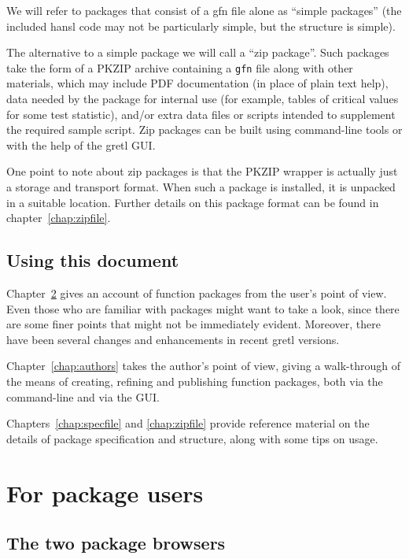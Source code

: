 \documentclass[oneside]{book}
\begin{document}
We will refer to packages that consist of a gfn file alone as ``simple
packages'' (the included hansl code may not be particularly simple,
but the structure is simple).

The alternative to a simple package we will call a ``zip package''.
Such packages take the form of a \textsf{PKZIP} archive containing a
\texttt{gfn} file along with other materials, which may include PDF
documentation (in place of plain text help), data needed by the
package for internal use (for example, tables of critical values for
some test statistic), and/or extra data files or scripts intended to
supplement the required sample script. Zip packages can be built using
command-line tools or with the help of the gretl GUI.

One point to note about zip packages is that the \textsf{PKZIP}
wrapper is actually just a storage and transport format. When such a
package is installed, it is unpacked in a suitable location. Further
details on this package format can be found in
chapter~\ref{chap:zipfile}.

\section{Using this document}

Chapter~\ref{chap:users} gives an account of function packages from
the user's point of view. Even those who are familiar with packages
might want to take a look, since there are some finer points that
might not be immediately evident. Moreover, there have been several
changes and enhancements in recent gretl versions.

Chapter~\ref{chap:authors} takes the author's point of view, giving a
walk-through of the means of creating, refining and publishing
function packages, both via the command-line and via the GUI.

Chapters~\ref{chap:specfile} and \ref{chap:zipfile} provide reference
material on the details of package specification and structure, along
with some tips on usage.


\chapter{For package users}
\label{chap:users}

\section{The two package browsers}
\label{sec:browsers}
\end{document}
